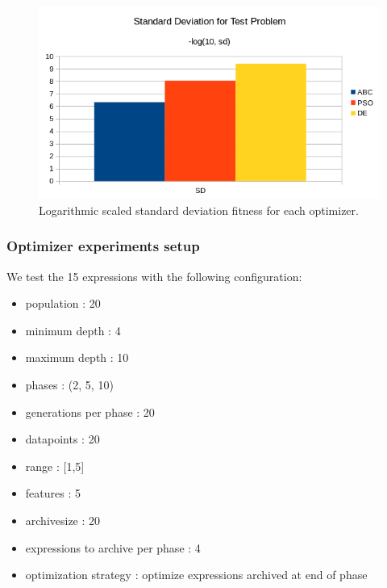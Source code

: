 \begin{figure}
    \centering
    \includegraphics[width=\textwidth,height=\textheight,keepaspectratio]{figures/testproblem_sdfitness.png}
    \caption{Logarithmic scaled standard deviation fitness for each optimizer.}
    \label{fig:testproblemsd}
\end{figure}

\subsubsection{Optimizer experiments setup}
We test the 15 expressions with the following configuration:
\begin{itemize}
\item population : 20
\item minimum depth : 4
\item maximum depth : 10
\item phases : (2, 5, 10)
\item generations per phase : 20
\item datapoints : 20
\item range : [1,5]
\item features : 5
\item archivesize : 20
\item expressions to archive per phase : 4
\item optimization strategy : optimize expressions archived at end of phase
\end{itemize}
